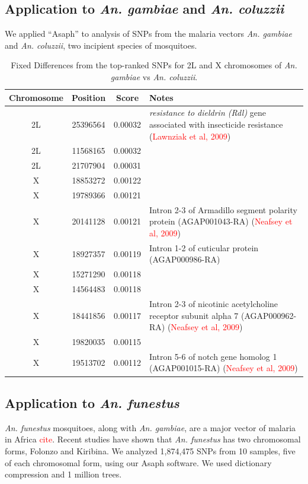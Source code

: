 \subsection{Application to \emph{An. gambiae} and \emph{An. coluzzii}}
We applied ``Asaph'' to analysis of SNPs from the malaria vectors \emph{An. gambiae} and \emph{An. coluzzii}, two incipient species of mosquitoes.

\begin{table}[h!]
  \begin{center}
    \begin{tabular}{ c c c p{8cm} }
      \hline
      \textbf{Chromosome} & \textbf{Position} & \textbf{Score} & \textbf{Notes} \\ \hline
      2L & 25396564 & 0.00032 &  \emph{resistance to dieldrin (Rdl)} gene associated with insecticide resistance (\textcolor{red}{Lawnziak et al, 2009})\\
      2L & 11568165 & 0.00032 &  \\
      2L & 21707904 & 0.00031 &  \\
      X  & 18853272 & 0.00122 &  \\
      X  & 19789366 & 0.00121 &  \\
      X  & 20141128 & 0.00121 & Intron 2-3 of Armadillo segment polarity protein (AGAP001043-RA) (\textcolor{red}{Neafsey et al, 2009})\\
      X  & 18927357 & 0.00119 & Intron 1-2 of cuticular protein (AGAP000986-RA) \\
      X  & 15271290 & 0.00118 &  \\
      X  & 14564483 & 0.00118 &  \\
      X  & 18441856 & 0.00117 & Intron 2-3 of nicotinic acetylcholine receptor subunit alpha 7 (AGAP000962-RA) (\textcolor{red}{Neafsey et al, 2009})\\
      X  & 19820035 & 0.00115 &  \\
      X  & 19513702 & 0.00112 & Intron 5-6 of notch gene homolog 1 (AGAP001015-RA) (\textcolor{red}{Neafsey et al, 2009})\\
    \end{tabular}
  \end{center}
  \caption{Fixed Differences from the top-ranked SNPs for 2L and X chromosomes of \emph{An. gambiae} vs \emph{An. coluzzii}.}
  \label{tab:filtered-features-example}
\end{table}

\subsection{Application to \emph{An. funestus}}
\emph{An. funestus} mosquitoes, along with \emph{An. gambiae}, are a major vector of malaria in Africa \textcolor{red}{cite}. Recent studies have shown that \emph{An. funestus} has two chromosomal forms, Folonzo and Kiribina.  We analyzed 1,874,475 SNPs from 10 samples, five of each chromosomal form, using our Asaph software.  We used dictionary compression and 1 million trees.

